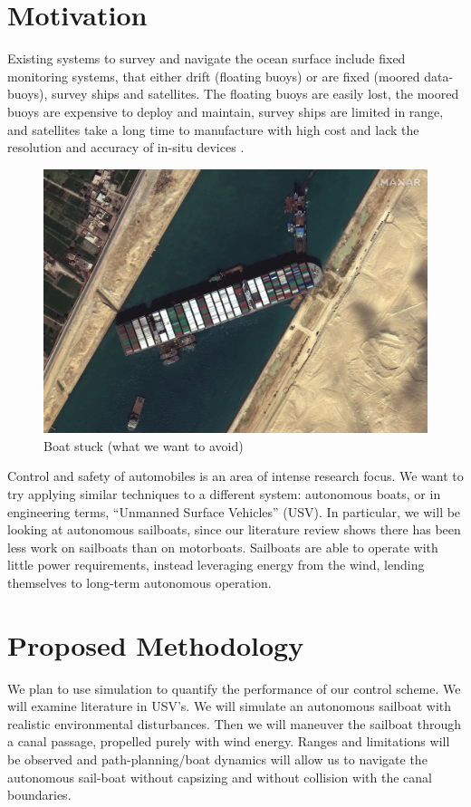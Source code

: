 \documentclass[conference]{IEEEtran}
\begin{document}
\section{Motivation}
 Existing systems to survey and navigate the ocean surface include fixed monitoring systems, that either drift (floating buoys) or are fixed (moored data-buoys), survey ships and satellites. The floating buoys are easily lost, the moored buoys are expensive to deploy and maintain, survey ships are limited in range, and satellites take a long time to manufacture with high cost and lack the resolution and accuracy of in-situ devices \cite{Sauze2006}.
\begin{figure}
    \centering
    \includegraphics{documents/figures/Suez_Canal_blocked_by_Ever_Given_March_27_2021.jpg}
    \caption{Boat stuck (what we want to avoid)\label{fig:boat_stuck}}
\end{figure}
Control and safety of automobiles is an area of intense research focus. We want to try applying similar techniques to a different system: autonomous boats, or in engineering terms, \enquote{Unmanned Surface Vehicles} (USV). In particular, we will be looking at autonomous sailboats, since our literature review shows there has been less work on sailboats than on motorboats.
Sailboats are able to operate with little power requirements, instead leveraging energy from the wind, lending themselves to long-term autonomous operation.

\section{Proposed Methodology}
We plan to use simulation to quantify the performance of our control scheme. We will examine literature in USV's.
We will simulate an autonomous sailboat with realistic environmental disturbances.
Then we will maneuver the sailboat through a canal passage, propelled purely with wind energy. Ranges and limitations will be observed and path-planning/boat dynamics will allow us to navigate the autonomous sail-boat without capsizing and without collision with the canal boundaries. 
\end{document}

